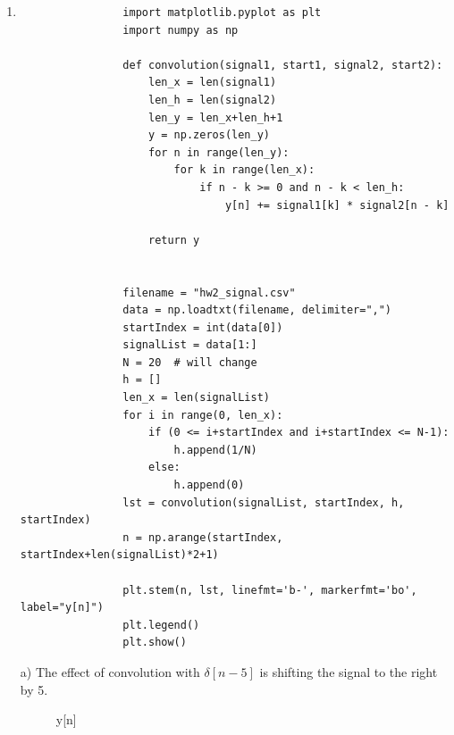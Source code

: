 \documentclass[10pt,a4paper, margin=1in]{article}
\begin{document}
\begin{enumerate}
\begin{enumerate}
    \end{enumerate}
 \newpage   
\item %
    \begin{enumerate}
        \begin{verbatim}
                import matplotlib.pyplot as plt
                import numpy as np
                
                def convolution(signal1, start1, signal2, start2):
                    len_x = len(signal1)
                    len_h = len(signal2)
                    len_y = len_x+len_h+1
                    y = np.zeros(len_y)
                    for n in range(len_y):
                        for k in range(len_x):
                            if n - k >= 0 and n - k < len_h:
                                y[n] += signal1[k] * signal2[n - k]
                
                    return y
                
                
                filename = "hw2_signal.csv"
                data = np.loadtxt(filename, delimiter=",")
                startIndex = int(data[0])
                signalList = data[1:]
                N = 20  # will change
                h = []
                len_x = len(signalList)
                for i in range(0, len_x):
                    if (0 <= i+startIndex and i+startIndex <= N-1):
                        h.append(1/N)
                    else:
                        h.append(0)
                lst = convolution(signalList, startIndex, h, startIndex)
                n = np.arange(startIndex, startIndex+len(signalList)*2+1)
                
                plt.stem(n, lst, linefmt='b-', markerfmt='bo', label="y[n]")
                plt.legend()
                plt.show()
            \end{verbatim}

         a) The effect of convolution with $\delta[n-5]$ is shifting the signal to the right by 5.
            \begin{figure}[htp] 
                \caption{y[n]}
            \end{figure}
        

\end{enumerate}
\end{enumerate}
\end{document}
